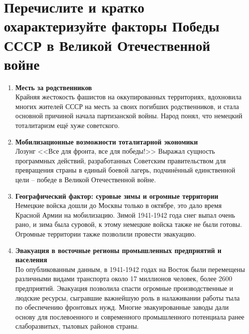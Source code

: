 \documentclass[12pt]{article}
\newcommand{\blue}[1]{\textcolor{blue}{#1}}
\newcommand{\teal}[1]{\textcolor{teal}{#1}}
\begin{document}
  \newpage
  \section{Перечислите и кратко охарактеризуйте факторы Победы СССР в Великой Отечественной войне}
  \begin{enumerate}[label=\textbf{\large\arabic*}]
    \item \textbf{Месть за родственников} \\
    Крайняя жестокость фашистов на оккупированных территориях,
    вдохновила многих жителей СССР на месть за своих погибших родственников,
    и стала основной причиной начала партизанской войны.
    Народ понял, что немецкий тоталитаризм ещё хуже советского.

    \item \textbf{Мобилизационные возможности тоталитарной экономики} \\
    Лозунг <<Все для фронта, все для победы!>> Выражал сущность программных действий,
    разработанных Советским правительством для превращения страны в единый боевой лагерь,
    подчинённый единственной цели -- победе в Великой Отечественной войне.

    \item \textbf{Географический фактор: суровые зимы и огромные территории} \\
    Немецкие войска дошли до Москвы только в октябре, это дало время Красной Армии на мобилизацию.
    Зимой 1941-1942 года снег выпал очень рано, и зима была суровой, к этому немецкие войска также не были готовы.
    Огромные территории также позволили провести эвакуацию.

    \item \textbf{Эвакуация в восточные регионы промышленных предприятий и населения} \\
    По опубликованным данным, в 1941-1942 годах на Восток
    были перемещены различными видами транспорта около 17 миллионов человек, более 2600 предприятий.
    Эвакуация позволила спасти огромные производственные и людские ресурсы,
    сыгравшие важнейшую роль в налаживании работы тыла по обеспечению фронтовых нужд.
    Многие эвакуированные заводы дали основу для послевоенного и современного промышленного потенциала ранее слаборазвитых,
    тыловых районов страны.


\end{enumerate}
\end{document}
